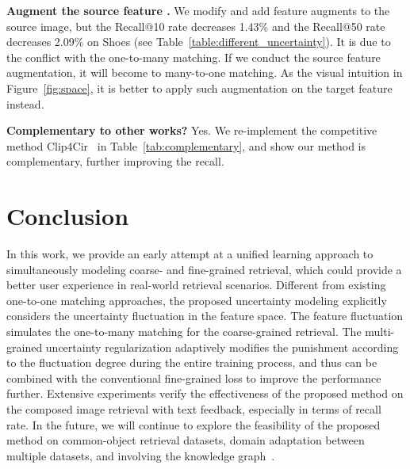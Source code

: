 \documentclass[10pt,twocolumn,letterpaper]{article}
\begin{document}
\noindent\textbf{Augment the source feature .} We modify and add feature augments to the source image, but the Recall@10 rate decreases
1.43\% and the Recall@50 rate decreases 2.09\% on Shoes (see Table~\ref{table:different_uncertainty}). It is due to the conflict with the one-to-many matching. If we conduct the source feature augmentation, it will become to many-to-one matching. As the visual intuition in Figure~\ref{fig:space}, it is better to apply such augmentation on the target feature instead.

\begin{table}[t]
\scriptsize
    \vspace{-.1in}
    \caption{Complementary to Clip4Cir on FashionIQ. : We re-implemented the method with one ResNet50.} 
    \label{tab:complementary}\vspace{-.2in}
\end{table}

\noindent\textbf{Complementary to other works?} Yes. We re-implement the competitive method Clip4Cir~\cite{CLIP4Cir} in Table~\ref{tab:complementary}, and show our method is complementary, further improving the recall. 

\section{Conclusion}
In this work, we provide an early attempt at a unified learning approach to simultaneously modeling coarse- and fine-grained retrieval, which could provide a better user experience in real-world retrieval scenarios.
Different from existing one-to-one matching approaches, the proposed uncertainty modeling explicitly considers the uncertainty fluctuation in the feature space. The feature fluctuation simulates the one-to-many matching for the coarse-grained retrieval. The multi-grained uncertainty regularization adaptively modifies the punishment according to the fluctuation degree during the entire training process, and thus can be combined with the conventional fine-grained loss to improve the performance further. Extensive experiments verify the effectiveness of the proposed method on the composed image retrieval with text feedback, especially in terms of recall rate. In the future, we will continue to explore the feasibility of the proposed method on common-object retrieval datasets, domain adaptation between multiple datasets, and involving the knowledge graph~\cite{liu2020hyperbolic,sun2021dynamic}.
\end{document}
